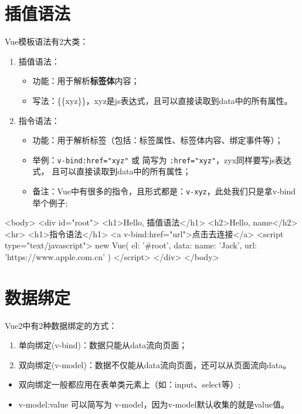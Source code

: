 \section{插值语法}
Vue模板语法有2大类：
\begin{enumerate}
    \item 插值语法：
          \begin{itemize}
              \item 功能：用于解析\textbf{标签体}内容；
              \item 写法：\{\{xyz\}\}，xyz是js表达式，且可以直接读取到data中的所有属性。
          \end{itemize}
    \item 指令语法：
          \begin{itemize}
              \item 功能：用于解析标签（包括：标签属性、标签体内容、绑定事件等）；
              \item 举例：\verb|v-bind:href="xyz"| 或  简写为 \verb|:href="xyz"|，zyx同样要写js表达式，
                    且可以直接读取到data中的所有属性；
              \item 备注：Vue中有很多的指令，且形式都是：\verb|v-xyz|，此处我们只是拿v-bind举个例子;
          \end{itemize}
\end{enumerate}
\begin{html}
    <body>
    <div id="root">
    <h1>Hello, 插值语法</h1>
    <h2>Hello, {{name}}</h2>
    <hr>
    <h1>指令语法</h1>
    <a v-bind:href="url">点击去连接</a>
    <script type="text/javascript">
    new Vue({
    el: '#root',
    data: {
    name: 'Jack',
    url: 'https://www.apple.com.cn'
    }
    })
    </script>
    </div>
    </body>
\end{html}
\section{数据绑定}
Vue2中有2种数据绑定的方式：
\begin{enumerate}
    \item 单向绑定(v-bind)：数据只能从data流向页面；
    \item 双向绑定(v-model)：数据不仅能从data流向页面，还可以从页面流向data。
\end{enumerate}


\begin{itemize}
    \item 双向绑定一般都应用在表单类元素上（如：input、select等）;
    \item v-model:value 可以简写为 v-model，因为v-model默认收集的就是value值。
\end{itemize}

